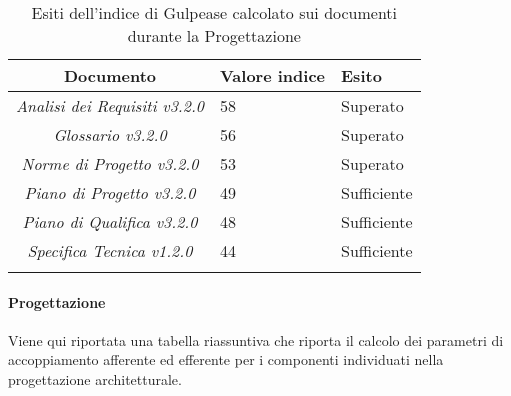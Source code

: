 \begin{longtable}{|c|p{3cm}|p{3cm}|}
\toprule
\textbf{Documento} & \textbf{Valore indice} & \textbf{Esito} \\


\midrule
\emph{Analisi dei Requisiti v3.2.0} & 58 & Superato \\
\midrule
\emph{Glossario v3.2.0} & 56 & Superato \\
\midrule
\emph{Norme di Progetto v3.2.0} & 53  & Superato\\
\midrule
\emph{Piano di Progetto v3.2.0} & 49  & Sufficiente\\
\midrule
\emph{Piano di Qualifica v3.2.0} & 48  & Sufficiente\\
\midrule
\emph{Specifica Tecnica v1.2.0} & 44 & Sufficiente\\
\bottomrule
\caption{Esiti dell'indice di Gulpease calcolato sui documenti durante la Progettazione}
\label{tab:changelog}
\end{longtable}

\paragraph{Progettazione}
Viene qui riportata una tabella riassuntiva che riporta il calcolo dei parametri di accoppiamento afferente ed efferente per i componenti individuati nella progettazione architetturale.

